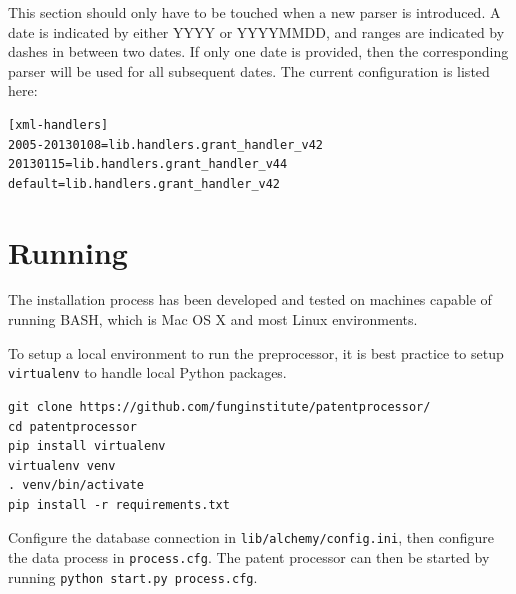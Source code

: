 \documentclass[11pt]{article}
\begin{document}
This section should only have to be touched when a new parser is introduced.  A
date is indicated by either YYYY or YYYYMMDD, and ranges are indicated by
dashes in between two dates. If only one date is provided, then the
corresponding parser will be used for all subsequent dates. The current
configuration is listed here:

\begin{verbatim}
[xml-handlers]
2005-20130108=lib.handlers.grant_handler_v42
20130115=lib.handlers.grant_handler_v44
default=lib.handlers.grant_handler_v42
\end{verbatim}

\section{Running}

The installation process has been developed and tested on machines capable of running BASH, which
is Mac OS X and most Linux environments.

To setup a local environment to run the preprocessor, it is best practice to
setup \verb`virtualenv` to handle local Python packages.

\begin{verbatim}
git clone https://github.com/funginstitute/patentprocessor/
cd patentprocessor
pip install virtualenv
virtualenv venv
. venv/bin/activate
pip install -r requirements.txt
\end{verbatim}

Configure the database connection in \verb`lib/alchemy/config.ini`, then
configure the data process in \verb`process.cfg`. The patent processor can then
be started by running \verb`python start.py process.cfg`.
\end{document}
